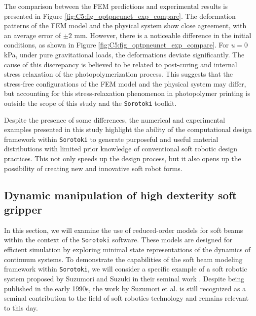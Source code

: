 The comparison between the FEM predictions and experimental results is presented in Figure \ref{fig:C5:fig_optpneunet_exp_compare}. The deformation patterns of the FEM model and the physical system show close agreement, with an average error of $\pm 2$ \si{\milli \meter}. However, there is a noticeable difference in the initial conditions, as shown in Figure \ref{fig:C5:fig_optpneunet_exp_compare}. For $u = 0$ \si{\kilo \pascal}, under pure gravitational loads, the deformations deviate significantly. The cause of this discrepancy is believed to be related to post-curing and internal stress relaxation of the photopolymerization process. This suggests that the stress-free configurations of the FEM model and the physical system may differ, but accounting for this stress-relaxation phenomenon in photopolymer printing is outside the scope of this study and the \texttt{Sorotoki} toolkit.

Despite the presence of some differences, the numerical and experimental examples presented in this study highlight the ability of the computational design framework within \texttt{Sorotoki} to generate purposeful and useful material distributions with limited prior knowledge of conventional soft robotic design practices. This not only speeds up the design process, but it also opens up the possibility of creating new and innovative soft robot forms.

\subsection{Dynamic manipulation of high dexterity soft gripper}
\label{sec:C5:suzumori_gripper}
In this section, we will examine the use of reduced-order models for soft beams within the context of the \texttt{Sorotoki} software. These models are designed for efficient simulation by exploring minimal state representations of the dynamics of continuum systems. To demonstrate the capabilities of the soft beam modeling framework within \texttt{Sorotoki}, we will consider a specific example of a soft robotic system proposed by Suzumori and Suzuki in their seminal work \cite{Suzumori1991,Suzumori1992}. Despite being published in the early 1990s, the work by Suzumori et al. is still recognized as a seminal contribution to the field of soft robotics technology and remains relevant to this day.

